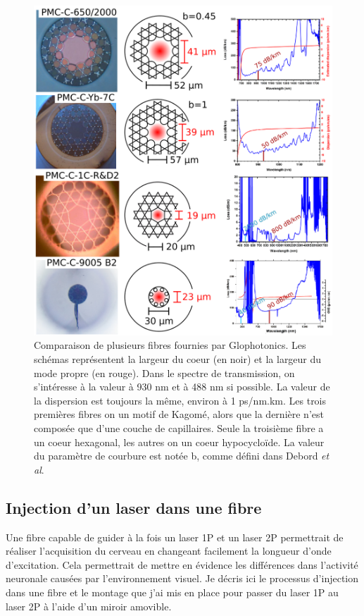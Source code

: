 \begin{figure}
\centering
\includegraphics[width=\textwidth]{./files/glofibers.svg.png}
\caption{Comparaison de plusieurs fibres fournies par Glophotonics. Les schémas représentent la largeur du coeur (en noir) et la largeur du mode propre (en rouge). Dans le spectre de transmission, on s'intéresse à la valeur à 930 nm et à 488 nm si possible. La valeur de la dispersion est toujours la même, environ à 1 ps/nm.km. Les trois premières fibres on un motif de Kagomé, alors que la dernière n'est composée que d'une couche de capillaires. Seule la troisième fibre a un coeur hexagonal, les autres on un coeur hypocycloïde. La valeur du paramètre de courbure est notée b, comme défini dans Debord \emph{et al}.  %
}
\end{figure}


\subsection{Injection d'un laser dans une fibre}


Une fibre capable de guider à la fois un laser 1P et un laser 2P permettrait de réaliser l'acquisition du cerveau en changeant facilement la longueur d'onde d'excitation. Cela permettrait de mettre en évidence les différences dans l'activité neuronale causées par l'environnement visuel. Je décris ici le processus d'injection dans une fibre et le montage que j'ai mis en place pour passer du laser 1P au laser 2P à l'aide d'un miroir amovible. 

